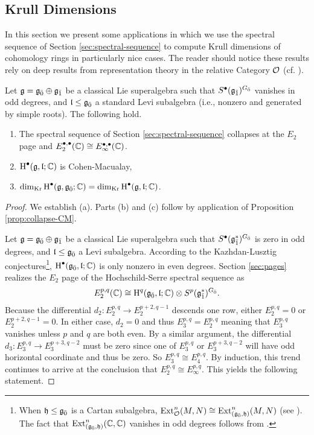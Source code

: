 \subsection{Krull Dimensions}
\label{sec:krull-dims}

In this section we present some applications in which we use the spectral sequence of Section \ref{sec:spectral-sequence} to compute Krull dimensions of cohomology rings in particularly nice cases. The reader should notice these results rely on deep results from representation theory in the relative Category $\mathcal{O}$ (cf. \cite[\S 8]{MR2428237}).

\begin{theorem} \label{prop:E2-collapse}
  Let $\mathfrak{g} = {\mathfrak{g}}_{\bar{0}} \oplus {\mathfrak{g}}_{\bar{1}}$ be a classical Lie superalgebra such that $S^\bullet({\mathfrak{g}}_{\bar{1}})^{{G}_{\bar{0}}}$ vanishes in odd degrees, and $\mathfrak{l} \leq {\mathfrak{g}}_{\bar{0}}$ a standard Levi subalgebra (i.e., nonzero and generated by simple roots). The following hold.
  \begin{enumerate}[\indent\rm (a)]
    \item The spectral sequence of Section \ref{sec:spectral-sequence} collapses at the $E_2$ page and $E_2^{\bullet,\bullet}(\mathbb{C}) \cong E_\infty^{\bullet,\bullet}(\mathbb{C})$.
    \item $\operatorname{H}^\bullet(\mathfrak{g},\mathfrak{l};\mathbb{C})$ is Cohen-Macualay,
    \item $\dim_{\operatorname{Kr}} \operatorname{H}^\bullet(\mathfrak{g},{\mathfrak{g}}_{\bar{0}};\mathbb{C}) = \dim_{\operatorname{Kr}} \operatorname{H}^\bullet(\mathfrak{g},\mathfrak{l};\mathbb{C})$.
  \end{enumerate}
\end{theorem}

\begin{proof}
  We establish (a). Parts (b) and (c) follow by application of Proposition \ref{prop:collapse-CM}.

  Let $\mathfrak{g} = {\mathfrak{g}}_{\bar{0}} \oplus {\mathfrak{g}}_{\bar{1}}$ be a classical Lie superalgebra such that $S^\bullet({\mathfrak{g}}_{\bar{1}}^*)^{{G}_{\bar{0}}}$ is zero in odd degrees, and $\mathfrak{l} \leq {\mathfrak{g}}_{\bar{0}}$ a Levi subalgebra. According to the Kazhdan-Lusztig conjectures\footnote{When $\mathfrak{h} \leq {\mathfrak{g}}_{\bar{0}}$ is a Cartan subalgebra, $\operatorname{Ext}^n_{\mathcal{O}}(M,N) \cong \operatorname{Ext}^n_{({\mathfrak{g}}_{\bar{0}},\mathfrak{h})}(M,N)$ (see \cite[Theorem 6.15]{MR2428237}). The fact that $\operatorname{Ext}^n_{({\mathfrak{g}}_{\bar{0}},\mathfrak{h})}(\mathbb{C},\mathbb{C})$ vanishes in odd degrees follows from \cite{MR1245719}.}, $\operatorname{H}^\bullet({\mathfrak{g}}_{\bar{0}},\mathfrak{l};\mathbb{C})$ is only nonzero in even degrees. Section \ref{sec:pages} realizes the $E_2$ page of the Hochschild-Serre spectral sequence as
\[
  E_2^{p,q}(\mathbb{C}) \cong \operatorname{H}^q({\mathfrak{g}}_{\bar{0}},\mathfrak{l};\mathbb{C}) \otimes S^p({\mathfrak{g}}_{\bar{1}}^*)^{{G}_{\bar{0}}}.
\]
Because the differential $d_2:E_2^{p,q} \to E_2^{p+2,q-1}$ descends one row, either $E_2^{p,q} = 0$ or $E_2^{p+2,q-1} = 0$. In either case, $d_2 = 0$ and thus $E_3^{p,q} = E_2^{p,q}$ meaning that $E_3^{p,q}$ vanishes unless $p$ and $q$ are both even. By a similar argument, the differential $d_3:E_3^{p,q} \to E_3^{p+3,q-2}$ must be zero since one of $E_3^{p,q}$ or $E_3^{p+3,q-2}$ will have odd horizontal coordinate and thus be zero. So $E_3^{p,q} \cong E_4^{p,q}$. By induction, this trend continues to arrive at the conclusion that $E_2^{p,q} \cong E_\infty^{p,q}$. This yields the following statement.
\end{proof}


